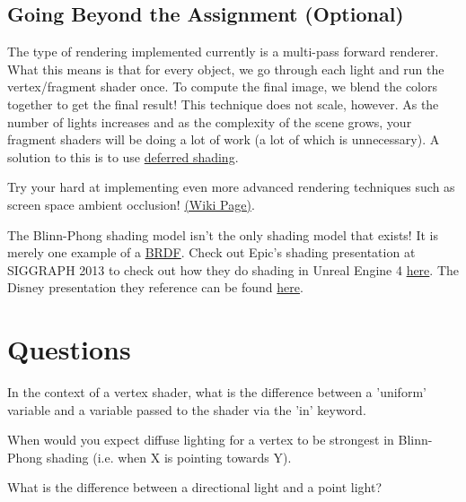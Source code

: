 \documentclass{article}
\begin{document}
\subsection*{Going Beyond the Assignment (Optional)}
\begin{itemize*}
    \item The type of rendering implemented currently is a multi-pass forward renderer. What this means is that for every object, we go through each light and run the vertex/fragment shader once. To compute the final image, we blend the colors together to get the final result! This technique does not scale, however. As the number of lights increases and as the complexity of the scene grows, your fragment shaders will be doing a lot of work (a lot of which is unnecessary). A solution to this is to use \href{https://en.wikipedia.org/wiki/Deferred_shading}{deferred shading}. 
    \item Try your hard at implementing even more advanced rendering techniques such as screen space ambient occlusion! \href{https://en.wikipedia.org/wiki/Screen_space_ambient_occlusion}{(Wiki Page)}.
    \item The Blinn-Phong shading model isn't the only shading model that exists! It is merely one example of a \href{https://en.wikipedia.org/wiki/Bidirectional_reflectance_distribution_function}{BRDF}. Check out Epic's shading presentation at SIGGRAPH 2013 to check out how they do shading in Unreal Engine 4 \href{http://blog.selfshadow.com/publications/s2013-shading-course/karis/s2013_pbs_epic_notes_v2.pdf}{here}. The Disney presentation they reference can be found \href{http://blog.selfshadow.com/publications/s2012-shading-course/burley/s2012_pbs_disney_brdf_notes_v3.pdf}{here}.
\end{itemize*}

\section*{Questions}
\begin{enumerate*}
    \item In the context of a vertex shader, what is the difference between a 'uniform' variable and a variable passed to the shader via the 'in' keyword.
    \item When would you expect diffuse lighting for a vertex to be strongest in Blinn-Phong shading (i.e. when X is pointing towards Y).
    \item What is the difference between a directional light and a point light?
\end{enumerate*}
\end{document}
